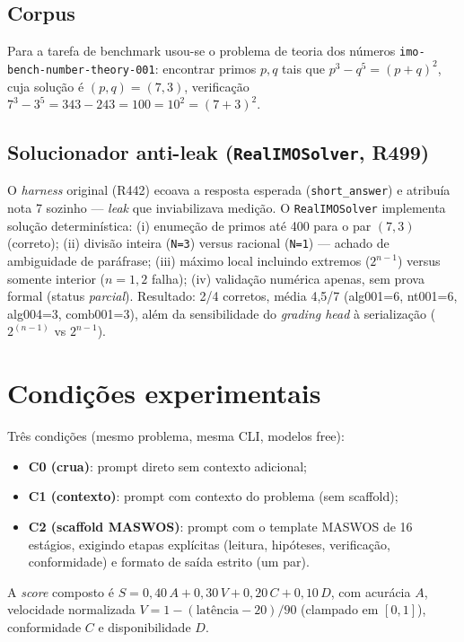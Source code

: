 \subsection*{Corpus}

Para a tarefa de benchmark usou-se o problema de teoria dos números
\texttt{imo-bench-number-theory-001}: encontrar primos $p,q$ tais que
$p^3 - q^5 = (p+q)^2$, cuja solução é $(p,q)=(7,3)$, verificação
$7^3 - 3^5 = 343 - 243 = 100 = 10^2 = (7+3)^2$.

\subsection*{Solucionador anti-leak (\texttt{RealIMOSolver}, R499)}
O \textit{harness} original (R442) ecoava a resposta esperada
(\texttt{short\_answer}) e atribuía nota 7 sozinho — \textit{leak} que
inviabilizava medição. O \texttt{RealIMOSolver} implementa solução
determinística: (i) enumeção de primos até 400 para o par $(7,3)$ (correto);
(ii) divisão inteira (\texttt{N=3}) versus racional (\texttt{N=1}) — achado
de ambiguidade de paráfrase; (iii) máximo local incluindo extremos
($2^{n-1}$) versus somente interior ($n=1,2$ falha); (iv) validação numérica
apenas, sem prova formal (status \textit{parcial}). Resultado: 2/4 corretos,
média 4,5/7 (alg001=6, nt001=6, alg004=3, comb001=3), além da sensibilidade
do \textit{grading head} à serialização ($2^{(n-1)}$ vs $2^{n-1}$).

\section{Condições experimentais}

Três condições (mesmo problema, mesma CLI, modelos free):
\begin{itemize}
  \item \textbf{C0 (crua)}: prompt direto sem contexto adicional;
  \item \textbf{C1 (contexto)}: prompt com contexto do problema (sem scaffold);
  \item \textbf{C2 (scaffold MASWOS)}: prompt com o template MASWOS de 16
  estágios, exigindo etapas explícitas (leitura, hipóteses, verificação,
  conformidade) e formato de saída estrito (um par).
\end{itemize}
A \textit{score} composto é $S = 0{,}40\,A + 0{,}30\,V + 0{,}20\,C + 0{,}10\,D$,
com acurácia $A$, velocidade normalizada $V = 1 - (\text{latência} - 20)/90$
(clampado em $[0,1]$), conformidade $C$ e disponibilidade $D$.

